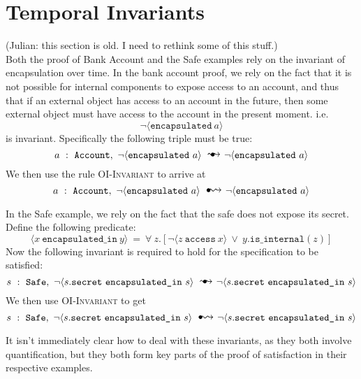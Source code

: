 \documentclass[12pt]{article}
\newcommand\trans{\mathlarger{\mathlarger \leadsto}}
\newcommand\oi{\hspace{1mm}{\raisebox{1pt}{$\bullet$}}\hspace{-1mm}{\trans}}
\newcommand\ot{\hspace{2mm}{\raisebox{1pt}{$\bullet$}}\hspace{-3mm}{\trans}}
\newcommand\onlyIf[3]{#1,\ #2\ \oi\ #3}
\newcommand\onlyThrough[3]{#1,\ #2\ \ot\ #3}
\numberwithin{case}{lemma}
\numberwithin{case}{theorem}
\numberwithin{subcase}{case}
\begin{document}
\newpage
\appendix

\section{Temporal Invariants}
{\color{red}(Julian: this section is old. I need to rethink some of this stuff.)}\\
Both the proof of Bank Account and the Safe examples rely on the invariant of encapsulation over time.
In the bank account proof, we rely on the fact that it is not possible for internal components to 
expose access to an account, and thus that if an external object has access to an account in the future, then 
some external object must have access to the account in the present moment. 
i.e.
$$\neg\langle \texttt{encapsulated}\ a  \rangle$$
is invariant. Specifically the following triple must be true:
$$\onlyThrough{a\ :\ \texttt{Account}}{\neg\langle \texttt{encapsulated}\ a  \rangle}{\neg\langle \texttt{encapsulated}\ a  \rangle}$$
We then use the rule \textsc{OI-Invariant} to arrive at 
$$\onlyIf{a\ :\ \texttt{Account}}{\neg\langle \texttt{encapsulated}\ a  \rangle}{\neg\langle \texttt{encapsulated}\ a  \rangle}$$

In the Safe example, we rely on the fact that the safe does not expose
its secret. Define the following predicate:
$$\langle x\ \texttt{encapsulated\_in}\ y\rangle\ =\ \forall\ z.[\neg \langle z\ \texttt{access}\ x \rangle\ \vee\ y.\texttt{is\_internal}(z)]$$
Now the following invariant is required to hold for the specification to be satisfied:
\small
$$\onlyThrough{s\ :\ \texttt{Safe}}{\neg\langle s.\texttt{secret}\ \texttt{encapsulated\_in}\ s  \rangle}{\neg\langle s.\texttt{secret}\ \texttt{encapsulated\_in}\ s  \rangle}$$
\normalsize
We then use \textsc{OI-Invariant} to get
\small
$$\onlyIf{s\ :\ \texttt{Safe}}{\neg\langle s.\texttt{secret}\ \texttt{encapsulated\_in}\ s  \rangle}{\neg\langle s.\texttt{secret}\ \texttt{encapsulated\_in}\ s  \rangle}$$
\normalsize

It isn't immediately clear how to deal with these invariants, as they both involve quantification, but they both form key parts of the proof 
of satisfaction in their respective examples.
\end{document}

